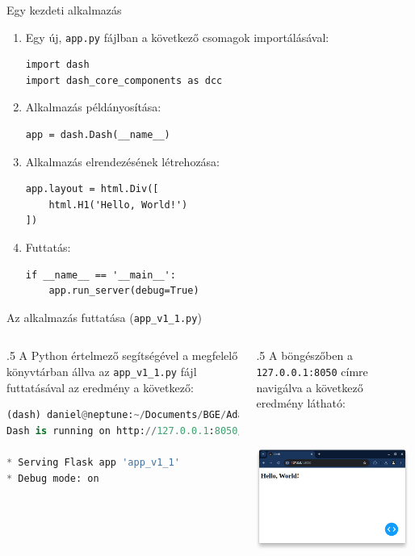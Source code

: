 \documentclass[english, aspectratio=169]{beamer}
\begin{document}
	\begin{frame}[fragile]{Egy kezdeti alkalmazás}
		\begin{enumerate}
			\item Egy új, \texttt{app.py} fájlban a következő csomagok importálásával:
			\begin{lstlisting}
import dash
import dash_core_components as dcc
			\end{lstlisting}
			\item Alkalmazás példányosítása:
			\begin{lstlisting}
app = dash.Dash(__name__)
			\end{lstlisting}
			\item Alkalmazás elrendezésének létrehozása:
			\begin{lstlisting}
app.layout = html.Div([
	html.H1('Hello, World!')
])
			\end{lstlisting}
			\item Futtatás:
			\begin{lstlisting}
if __name__ == '__main__':
	app.run_server(debug=True)
			\end{lstlisting}
		\end{enumerate}
	\end{frame}
	
	\begin{frame}[fragile]{Az alkalmazás futtatása (\texttt{app\_v1\_1.py})}
		\begin{columns}
			\begin{column}{.5\textwidth}
				A Python értelmező segítségével a megfelelő könyvtárban állva az \texttt{app\_v1\_1.py} fájl futtatásával az eredmény a következő:
				\begin{lstlisting}[language=python]
(dash) daniel@neptune:~/Documents/BGE/Adatbanyaszat/2_dash/code$ python app_v1_1.py
Dash is running on http://127.0.0.1:8050/

* Serving Flask app 'app_v1_1'
* Debug mode: on
				\end{lstlisting}
			\end{column}
			\begin{column}{.5\textwidth}
				A böngészőben a \texttt{127.0.0.1:8050} címre navigálva a következő eredmény látható:
				\begin{center}
					\includegraphics[width=5cm, height=5cm, keepaspectratio]{images/dash_5.png}
				\end{center}
			\end{column}
		\end{columns}
	\end{frame}
	
\end{document}

